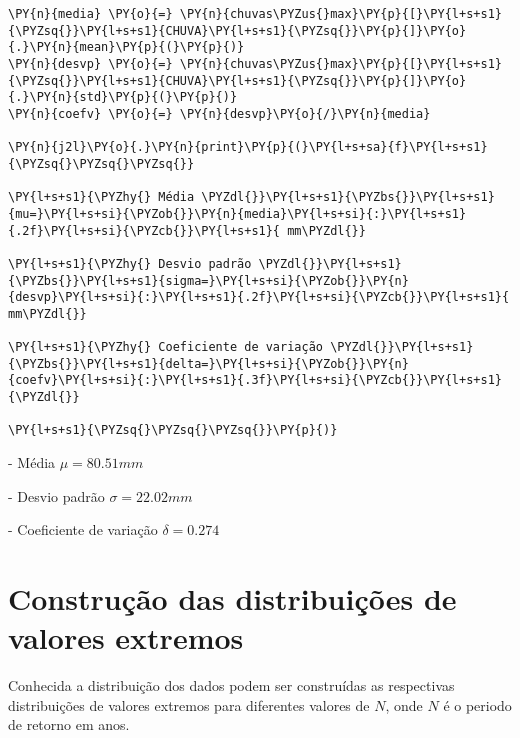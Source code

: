     \begin{tcolorbox}[breakable, size=fbox, boxrule=1pt, pad at break*=1mm,colback=cellbackground, colframe=cellborder]
\begin{Verbatim}[commandchars=\\\{\}]
\PY{n}{media} \PY{o}{=} \PY{n}{chuvas\PYZus{}max}\PY{p}{[}\PY{l+s+s1}{\PYZsq{}}\PY{l+s+s1}{CHUVA}\PY{l+s+s1}{\PYZsq{}}\PY{p}{]}\PY{o}{.}\PY{n}{mean}\PY{p}{(}\PY{p}{)}
\PY{n}{desvp} \PY{o}{=} \PY{n}{chuvas\PYZus{}max}\PY{p}{[}\PY{l+s+s1}{\PYZsq{}}\PY{l+s+s1}{CHUVA}\PY{l+s+s1}{\PYZsq{}}\PY{p}{]}\PY{o}{.}\PY{n}{std}\PY{p}{(}\PY{p}{)}
\PY{n}{coefv} \PY{o}{=} \PY{n}{desvp}\PY{o}{/}\PY{n}{media}

\PY{n}{j2l}\PY{o}{.}\PY{n}{print}\PY{p}{(}\PY{l+s+sa}{f}\PY{l+s+s1}{\PYZsq{}\PYZsq{}\PYZsq{}}

\PY{l+s+s1}{\PYZhy{} Média \PYZdl{}}\PY{l+s+s1}{\PYZbs{}}\PY{l+s+s1}{mu=}\PY{l+s+si}{\PYZob{}}\PY{n}{media}\PY{l+s+si}{:}\PY{l+s+s1}{.2f}\PY{l+s+si}{\PYZcb{}}\PY{l+s+s1}{ mm\PYZdl{}}

\PY{l+s+s1}{\PYZhy{} Desvio padrão \PYZdl{}}\PY{l+s+s1}{\PYZbs{}}\PY{l+s+s1}{sigma=}\PY{l+s+si}{\PYZob{}}\PY{n}{desvp}\PY{l+s+si}{:}\PY{l+s+s1}{.2f}\PY{l+s+si}{\PYZcb{}}\PY{l+s+s1}{ mm\PYZdl{}}

\PY{l+s+s1}{\PYZhy{} Coeficiente de variação \PYZdl{}}\PY{l+s+s1}{\PYZbs{}}\PY{l+s+s1}{delta=}\PY{l+s+si}{\PYZob{}}\PY{n}{coefv}\PY{l+s+si}{:}\PY{l+s+s1}{.3f}\PY{l+s+si}{\PYZcb{}}\PY{l+s+s1}{\PYZdl{}}

\PY{l+s+s1}{\PYZsq{}\PYZsq{}\PYZsq{}}\PY{p}{)}
\end{Verbatim}
\end{tcolorbox}

    

- Média $\mu=80.51 mm$

- Desvio padrão $\sigma=22.02 mm$

- Coeficiente de variação $\delta=0.274$



    
    \hypertarget{construuxe7uxe3o-das-distribuiuxe7uxf5es-de-valores-extremos}{%
\section{Construção das distribuições de valores
extremos}\label{construuxe7uxe3o-das-distribuiuxe7uxf5es-de-valores-extremos}}

Conhecida a distribuição dos dados podem ser construídas as respectivas
distribuições de valores extremos para diferentes valores de \(N\), onde
\(N\) é o periodo de retorno em anos.

